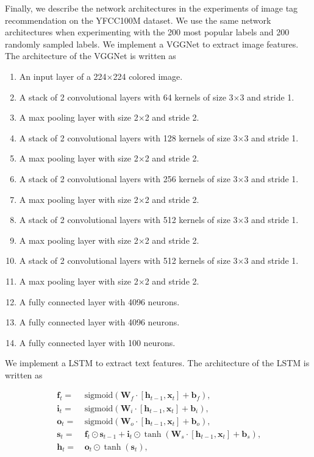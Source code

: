 \documentclass{article}
\newcommand{\OVEC}[1]{\bm{#1}} %
\newcommand{\MAT}[1]{\mathbf{#1}} %
\begin{document}
Finally, we describe the network architectures in the experiments of image tag recommendation on the YFCC100M dataset.
We use the same network architectures when experimenting with the 200 most popular labels and 200 randomly sampled labels.
We implement a VGGNet to extract image features.
The architecture of the VGGNet is written as
\begin{enumerate}
\item An input layer of a 224$\times$224 colored image.
\item A stack of 2 convolutional layers with 64 kernels of size 3$\times$3 and stride 1.
\item A max pooling layer with size 2$\times$2 and stride 2.
\item A stack of 2 convolutional layers with 128 kernels of size 3$\times$3 and stride 1.
\item A max pooling layer with size 2$\times$2 and stride 2.
\item A stack of 2 convolutional layers with 256 kernels of size 3$\times$3 and stride 1.
\item A max pooling layer with size 2$\times$2 and stride 2.
\item A stack of 2 convolutional layers with 512 kernels of size 3$\times$3 and stride 1.
\item A max pooling layer with size 2$\times$2 and stride 2.
\item A stack of 2 convolutional layers with 512 kernels of size 3$\times$3 and stride 1.
\item A max pooling layer with size 2$\times$2 and stride 2.
\item A fully connected layer with 4096 neurons.
\item A fully connected layer with 4096 neurons.
\item A fully connected layer with 100 neurons.
\end{enumerate}
We implement a LSTM to extract text features.
The architecture of the LSTM is written as
\begin{small}
\begin{equation*}
\begin{aligned}
\OVEC{f}_{t}=&\,\text{sigmoid}(\MAT{W}_{f}\cdot[\OVEC{h}_{t-1},\OVEC{x}_{t}]+\OVEC{b}_{f})\text{,}\\
\OVEC{i}_{t}=&\,\text{sigmoid}(\MAT{W}_{i}\cdot[\OVEC{h}_{t-1},\OVEC{x}_{t}]+\OVEC{b}_{i})\text{,}\\
\OVEC{o}_{t}=&\,\text{sigmoid}(\MAT{W}_{o}\cdot[\OVEC{h}_{t-1},\OVEC{x}_{t}]+\OVEC{b}_{o})\text{,}\\
\OVEC{s}_{t}=&\,\OVEC{f}_{t}\odot\OVEC{s}_{t-1}+
\OVEC{i}_{t}\odot\tanh(\MAT{W}_{s}\cdot[\OVEC{h}_{t-1},\OVEC{x}_{t}]+\OVEC{b}_{s})\text{,}\\
\OVEC{h}_{t}=&\,\OVEC{o}_{t}\odot\tanh(\OVEC{s}_{t})\text{,}
\end{aligned}
\end{equation*}
\end{small}%
\end{document}
